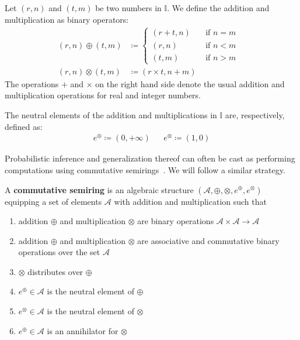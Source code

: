\begin{definition}
\label{def:inf_number_ops}
Let $(r, n)$ and $(t,m)$ be two numbers in $\mathbb{I}$. We define the addition and multiplication as binary operators:
\begin{align}
	(r,n) \oplus
	(t,m)
	&\coloneqq
	\begin{cases}
		(r+t,n) &\quad  \text{if $n=m$} \\
		(r,n) &\quad  \text{if $n<m$} \\
		(t,m) &\quad  \text{if $n>m$}
	\end{cases} 
    \label{eq:infininumber_plus}
    \\
	(r,n) \otimes
	(t,m)
	&\coloneqq (r \times t , n+m)  &
    \label{eq:infininumber_times}
\end{align}
The operations $+$ and $\times$ on the right hand side denote the usual addition and multiplication operations for real and integer numbers.
\end{definition}

\begin{definition}
\label{def:inf_number_neutral_elem}
The neutral elements of the addition and multiplications in $\mathbb{I}$ are, respectively, defined as:
\begin{align}
	e^\oplus  \coloneqq (0,+\infty)  &&
	e^\otimes  \coloneqq (1,0)
\end{align}
\end{definition}


Probabilistic inference and generalization thereof can often be cast as performing computations using commutative semirings~\citep{kimmig2017algebraic}. We will follow a similar strategy.

\begin{definition}\label{def:comm_semiring} 
	A {\bf  commutative semiring} is an algebraic structure $(\mathcal{A},\oplus,\otimes,\allowbreak e^{\oplus},e^\otimes)$ equipping a set of elements $\mathcal{A}$ with addition and multiplication such that
	\begin{enumerate}
		\item addition $\oplus$ and multiplication $\otimes$ are binary operations $\mathcal{A}\times \mathcal{A}\rightarrow \mathcal{A}$
		\item addition $\oplus$ and multiplication $\otimes$ are  associative and commutative binary operations over the set $\mathcal{A}$
		\item $\otimes$ distributes over $\oplus$
		\item  $e^\oplus \in \mathcal{A}$ is the neutral element of $\oplus$
		\item  $e^\otimes \in \mathcal{A}$ is the neutral element of $\otimes$
		\item $e^\oplus \in \mathcal{A}$ is an annihilator for $\otimes$
	\end{enumerate}
\end{definition}


